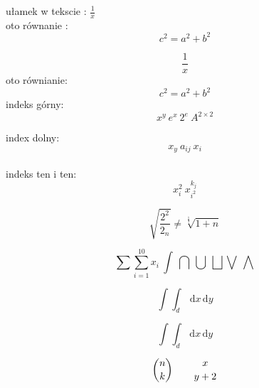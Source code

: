 \documentclass[11tp, a4paper]{article}
\begin{document}
ułamek w tekscie : $ \frac{1}{x} $ \\
oto równanie : $$ c^{2}=a^{2}+b^{2} $$  %
\linebreak
\linebreak

\begin{equation}
\frac{1}{x} 
\end{equation}
oto równianie:
\begin{equation}
c^{2}=a^{2}+b^{2} 
\end{equation}
indeks górny: $$ x^{y} \ e^{x} \ 2^{e} \ A^{2\times2} $$

index dolny: $$ x_y \ a_{ij} \ x_i $$ \\

indeks ten i ten: $$ x_i^{2} \ x_{i^2}^{k_j} $$
\linebreak

$$ \sqrt{\frac{2^2}{2_n}} \neq \sqrt[ \frac{1}{3}]{1+n} $$



$$ \sum \sum_{i=1}^{10}x_i \ \int \ \bigcap \ \bigcup \ \bigsqcup
\bigvee \ \bigwedge $$

$$ \int\int_{d}\ \mathrm{d} x \, \mathrm{d} y  $$

$$ \int\!\!\int_{d} \, \mathrm{d} x \, \mathrm{d} y$$

$$ {n \choose k}\qquad {x \atop y+2} $$
\end{document}
